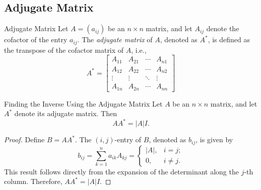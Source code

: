 \subsection{Adjugate Matrix}


\begin{definition}{Adjugate Matrix}{}
  Let $A = (a_{ij})$ be an $n \times n$ matrix, and let $A_{ij}$ denote
  the cofactor of the entry $a_{ij}$.
  The \emph{adjugate matrix} of $A$, denoted as $A^{\ast}$,
  is defined as the transpose of the cofactor matrix of $A$, i.e.,
  \begin{equation}
    A^*=\begin{bmatrix}A_{11}&A_{21}&\cdots&A_{n1}\\A_{12}&A_{22}&\cdots&A_{n2}\\\vdots&\vdots&\ddots&\vdots\\A_{1n}&A_{2n}&\cdots&A_{nn}\end{bmatrix}
  \end{equation}
\end{definition}

\begin{proposition}{Finding the Inverse Using the Adjugate Matrix}{}
  Let $A$ be an $n \times n$ matrix, and let $A^{\ast}$ denote its adjugate matrix.
  Then
  \begin{equation}
    AA^{\ast} = |A| I.
  \end{equation}
\end{proposition}

\begin{proof}
  Define $B = AA^{\ast}$.
  The $(i,j)$-entry of $B$, denoted as $b_{ij}$, is given by 
  \begin{equation}
    b_{ij} = \sum\limits_{k = 1}^n a_{ik} A_{kj} =
    \begin{cases}
      |A|, & i = j;\\
      0, & i \neq j.
    \end{cases}
  \end{equation}
  This result follows directly from the expansion of the determinant along the
  $j$-th column.
  Therefore, $AA^{\ast} = |A|I$.
\end{proof}



